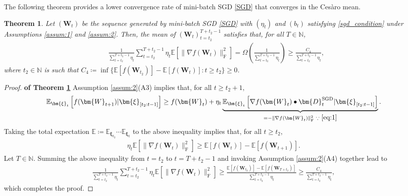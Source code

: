\documentclass[twoside,11pt]{article}
\newtheorem{thm}{Theorem}[section]
\begin{document}
The following theorem provides a lower convergence rate of mini-batch SGD \eqref{SGD} that converges in the Ces\`{a}ro mean.

\begin{thm}\label{thm:sgd_convergence_rate_lower}
Let $(\bm{W}_t)$ be the sequence generated by mini-batch SGD \eqref{SGD} with $(\eta_t)$ and $(b_t)$ satisfying \eqref{sgd_condition} under Assumptions \ref{assum:1} and \ref{assum:2}. Then, the mean of $(\bm{W}_t)_{t = t_2}^{T + t_2 -1}$ satisfies that, for all $T \in \mathbb{N}$,
\begin{align*}
&\frac{1}{\sum_{t= t_2}^{T + t_2 -1} \eta_t}
\sum_{t= t_2}^{T + t_2 -1} \eta_t 
\mathbb{E} [\| \nabla f (\bm{W}_t)\|_{\mathrm{F}}^2]
= \Omega \left( \frac{1}{\sum_{t= t_2}^{T + t_2 -1} \eta_t} \right) 
\geq
\frac{C_4}{\sum_{t = t_2}^{T + t_2 -1} \eta_t},
\end{align*}
where $t_2 \in \mathbb{N}$ is such that $C_4 \coloneqq \inf \{\mathbb{E}[f(\bm{W}_{t_2})] - \mathbb{E}[f(\bm{W}_t)] \colon t \geq t_2 \} \geq 0$.
\end{thm}

\begin{proof}
\textbf{of Theorem \ref{thm:sgd_convergence_rate_lower}} Assumption \ref{assum:2}(A3) implies that, for all $t \geq t_2 + 1$,
\begin{align*}
\mathbb{E}_{\bm{\xi}_t} \left[ f(\bm{W}_{t+1})|\bm{\xi}_{[t_2 : t-1]} \right]
\geq 
f(\bm{W}_t) 
+ \eta_t 
\underbrace{\mathbb{E}_{\bm{\xi}_t} \left[ \nabla f (\bm{W}_t) \bullet \bm{D}_t^{\mathrm{SGD}} |\bm{\xi}_{[t_2 : t-1]} \right]}_{= - \|\nabla f (\bm{W}_t)\|_{\mathrm{F}}^2 \text{ } \because \text{ } \eqref{eq:1}}.
\end{align*}
Taking the total expectation $\mathbb{E} \coloneqq \mathbb{E}_{\bm{\xi}_{t_2}} \cdots \mathbb{E}_{\bm{\xi}_{t}}$ to the above inequality implies that, for all $t \geq t_2$,
\begin{align*}
\eta_t \mathbb{E}[\|\nabla f (\bm{W}_t)\|_{\mathrm{F}}^2]
\geq 
\mathbb{E}[f(\bm{W}_t)] - \mathbb{E}[f(\bm{W}_{t+1})].
\end{align*}
Let $T \in \mathbb{N}$. Summing the above inequality from $t = t_2$ to $t = T + t_2 -1$ and invoking Assumption \ref{assum:2}(A4) together lead to
\begin{align*}
\frac{1}{\sum_{t = t_2}^{T + t_2 -1} \eta_t} \sum_{t = t_2}^{T + t_2 -1} \eta_t \mathbb{E}[\|\nabla f (\bm{W}_t)\|_{\mathrm{F}}^2]
\geq \frac{\mathbb{E}[f(\bm{W}_{t_2})] - \mathbb{E}[f(\bm{W}_{T + t_2})]}{\sum_{t = t_2}^{T + t_2 -1} \eta_t}
\geq \frac{C_4}{\sum_{t = t_2}^{T + t_2 -1} \eta_t},
\end{align*}
which completes the proof.
\end{proof}
\end{document}
